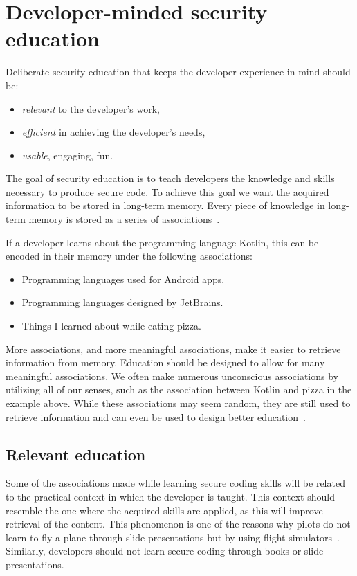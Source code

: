 \section{Developer-minded security education}

Deliberate security education that keeps the developer experience in mind should be:
\begin{itemize}[noitemsep]
    \item \emph{relevant} to the developer's work,
    \item \emph{efficient} in achieving the developer's needs,
    \item \emph{usable}, engaging, fun.
\end{itemize}

The goal of security education is to teach developers the knowledge and skills necessary to produce secure code. To achieve this goal we want the acquired information to be stored in long-term memory. Every piece of knowledge in long-term memory is stored as a series of associations~\citep{dirksen2015design}. 

If a developer learns about the programming language Kotlin, this can be encoded in their memory under the following associations:
\begin{itemize}[noitemsep]
    \item Programming languages used for Android apps.
    \item Programming languages designed by JetBrains.
    \item Things I learned about while eating pizza.
\end{itemize}

More associations, and more meaningful associations, make it easier to retrieve information from memory. Education should be designed to allow for many meaningful associations.
We often make numerous unconscious associations by utilizing all of our senses, such as the association between Kotlin and pizza in the example above. While these associations may seem random, they are still used to retrieve information and can even be used to design better education~\citep{dirksen2015design}. 

\subsection{Relevant education}
Some of the associations made while learning secure coding skills will be related to the practical context in which the developer is taught. This context should resemble the one where the acquired skills are applied, as this will improve retrieval of the content. This phenomenon is one of the reasons why pilots do not learn to fly a plane through slide presentations but by using flight simulators~\citep{dirksen2015design}. Similarly, developers should not learn secure coding through books or slide presentations. 


